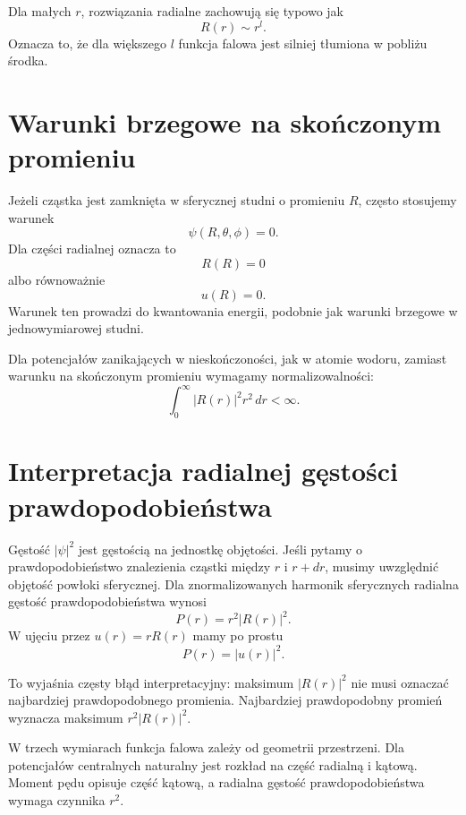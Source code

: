 Dla małych \(r\), rozwiązania radialne zachowują się typowo jak
\begin{equation}
    R(r)\sim r^l.
\end{equation}
Oznacza to, że dla większego \(l\) funkcja falowa jest silniej tłumiona w pobliżu środka.

\section{Warunki brzegowe na skończonym promieniu}

Jeżeli cząstka jest zamknięta w sferycznej studni o promieniu \(R\), często stosujemy warunek
\begin{equation}
    \psi(R,\theta,\phi)=0.
\end{equation}
Dla części radialnej oznacza to
\begin{equation}
    R(R)=0
\end{equation}
albo równoważnie
\begin{equation}
    u(R)=0.
\end{equation}
Warunek ten prowadzi do kwantowania energii, podobnie jak warunki brzegowe w jednowymiarowej studni.

Dla potencjałów zanikających w nieskończoności, jak w atomie wodoru, zamiast warunku na skończonym promieniu wymagamy normalizowalności:
\begin{equation}
    \int_0^\infty |R(r)|^2r^2\,dr<\infty.
\end{equation}

\section{Interpretacja radialnej gęstości prawdopodobieństwa}

Gęstość \(|\psi|^2\) jest gęstością na jednostkę objętości. Jeśli pytamy o prawdopodobieństwo znalezienia cząstki między \(r\) i \(r+dr\), musimy uwzględnić objętość powłoki sferycznej. Dla znormalizowanych harmonik sferycznych radialna gęstość prawdopodobieństwa wynosi
\begin{equation}
    P(r)=r^2|R(r)|^2.
\end{equation}
W ujęciu przez \(u(r)=rR(r)\) mamy po prostu
\begin{equation}
    P(r)=|u(r)|^2.
\end{equation}

To wyjaśnia częsty błąd interpretacyjny: maksimum \(|R(r)|^2\) nie musi oznaczać najbardziej prawdopodobnego promienia. Najbardziej prawdopodobny promień wyznacza maksimum \(r^2|R(r)|^2\).

\begin{summarybox}
W trzech wymiarach funkcja falowa zależy od geometrii przestrzeni. Dla potencjałów centralnych naturalny jest rozkład na część radialną i kątową. Moment pędu opisuje część kątową, a radialna gęstość prawdopodobieństwa wymaga czynnika \(r^2\).
\end{summarybox}

